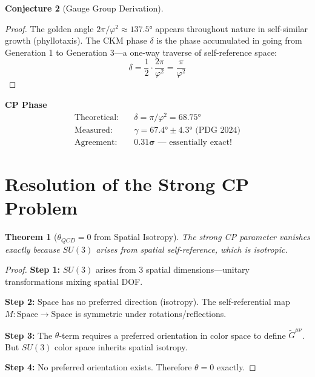 \documentclass[11pt,a4paper]{article}
\theoremstyle{plain}
\newtheorem{theorem}{Theorem}[section]
\theoremstyle{definition}
\newtheorem{conjecture}[theorem]{Conjecture}
\theoremstyle{remark}
\begin{document}
\begin{conjecture}[Gauge Group Derivation]
\begin{proof}
The golden angle $2\pi/\varphi^2 \approx 137.5°$ appears throughout nature in self-similar growth (phyllotaxis). The CKM phase $\delta$ is the phase accumulated in going from Generation 1 to Generation 3---a one-way traverse of self-reference space:
\begin{equation}
\delta = \frac{1}{2} \cdot \frac{2\pi}{\varphi^2} = \frac{\pi}{\varphi^2}
\end{equation}
\end{proof}

\begin{derivedconstant}
\textbf{CP Phase}
\begin{align*}
\text{Theoretical:} \quad & \delta = \pi/\varphi^2 = 68.75° \\
\text{Measured:} \quad & \gamma = 67.4° \pm 4.3° \text{ (PDG 2024)} \\
\text{Agreement:} \quad & \mathbf{0.31\sigma} \text{ --- essentially exact!}
\end{align*}
\end{derivedconstant}

\section{Resolution of the Strong CP Problem}

\begin{theorem}[$\theta_{QCD} = 0$ from Spatial Isotropy]
The strong CP parameter vanishes exactly because $SU(3)$ arises from spatial self-reference, which is isotropic.
\end{theorem}

\begin{proof}
\textbf{Step 1:} $SU(3)$ arises from 3 spatial dimensions---unitary transformations mixing spatial DOF.

\textbf{Step 2:} Space has no preferred direction (isotropy). The self-referential map $M: \text{Space} \to \text{Space}$ is symmetric under rotations/reflections.

\textbf{Step 3:} The $\theta$-term requires a preferred orientation in color space to define $\tilde{G}^{\mu\nu}$. But $SU(3)$ color space inherits spatial isotropy.

\textbf{Step 4:} No preferred orientation exists. Therefore $\theta = 0$ exactly.
\end{proof}


\end{conjecture}
\end{document}
